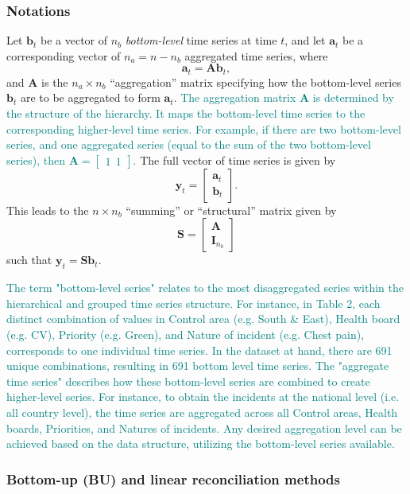 \documentclass[
  authoryear,
  preprint,
  3p]{elsarticle}
\begin{document}
\subsubsection{Notations}\label{notations}

Let \(\bm{b}_t\) be a vector of \(n_b\) \emph{bottom-level} time series
at time \(t\), and let \(\bm{a}_t\) be a corresponding vector of
\(n_a = n-n_b\) aggregated time series, where \[
  \bm{a}_t = \bm{A}\bm{b}_t,
\] and \(\bm{A}\) is the \(n_a\times n_b\) ``aggregation'' matrix
specifying how the bottom-level series \(\bm{b}_t\) are to be aggregated
to form \(\bm{a}_t\).
\textcolor{teal}{The aggregation matrix $\bm{A}$ is determined by the structure of the hierarchy. It maps the bottom-level time series to the corresponding higher-level time series. For example, if there are two bottom-level series, and one aggregated series (equal to the sum of the two bottom-level series), then $\bm{A} = \begin{bmatrix} 1 ~~ 1 \end{bmatrix}$.
} The full vector of time series is given by \[
 \bm{y}_t = \begin{bmatrix}\bm{a}_t \\\bm{b}_t\end{bmatrix}.
\] This leads to the \(n\times n_b\) ``summing'' or ``structural''
matrix given by \[
  \bm{S} = \begin{bmatrix}\bm{A} \\ \bm{I}_{n_b}\end{bmatrix}
\] such that \(\bm{y}_t = \bm{S}\bm{b}_t\).

\textcolor{teal}{The term "bottom-level series" relates to the most disaggregated series within the hierarchical and grouped time series structure. For instance, in Table 2, each distinct combination of values in Control area (e.g. South \& East), Health board (e.g. CV), Priority (e.g. Green), and Nature of incident (e.g. Chest pain), corresponds to one individual time series. In the dataset at hand, there are 691 unique combinations, resulting in 691 bottom level time series. The "aggregate time series" describes how these bottom-level series are combined to create higher-level series. For instance, to obtain the incidents at the national level (i.e. all country level), the time series are aggregated across all Control areas, Health boards, Priorities, and Natures of incidents. Any desired aggregation level can be achieved based on the data structure, utilizing the bottom-level series available.}

\subsubsection{Bottom-up (BU) and linear reconciliation
methods}\label{bottom-up-bu-and-linear-reconciliation-methods}
\end{document}
